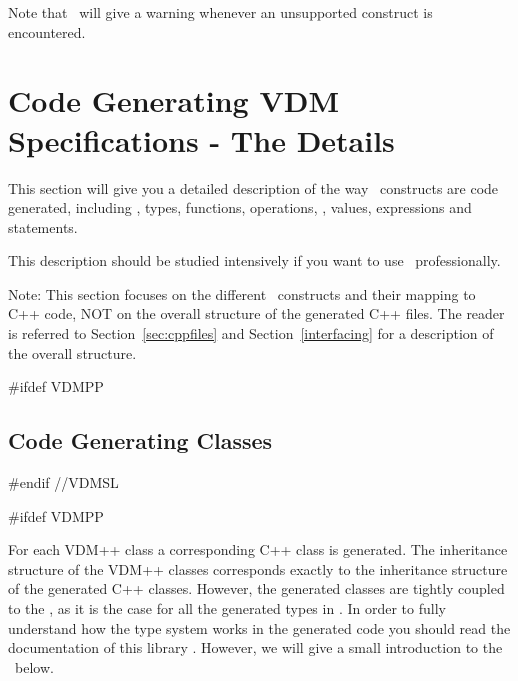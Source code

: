 \documentclass[\pformat,12pt]{article}
\begin{document}
Note that \Tcg\ will give a warning whenever an
unsupported construct is encountered.

%



\section{Code Generating VDM Specifications - The Details}\label{sec:relation}

This section will give you a detailed description of the way \VDM\ 
constructs are code generated, including
, types, functions,
operations, ,
values, expressions and statements.

This description should be studied intensively if you want to use \tcg\ 
professionally. 

Note: This section focuses on the different \VDM\ constructs and their
mapping to C++ code, NOT on the overall structure of the generated C++
files. The reader is referred to Section~\ref{sec:cppfiles} and
Section~\ref{interfacing} for a description of the overall structure.


#ifdef VDMPP
\subsection{Code Generating Classes}\label{sec:classes}
#endif //VDMSL


#ifdef VDMPP

For each VDM++ class a corresponding C++ class is generated. The inheritance
structure of the VDM++ classes corresponds exactly to the inheritance
structure of the generated C++ classes. However, the generated classes
are tightly coupled to the \MCL, as it is the case for all the generated types
in \tcg. In order to fully understand how the type system works in
the generated code you should read the documentation of this
library \libmancite.  However, we will give a small introduction to
the \MCL\ below.
\end{document}
